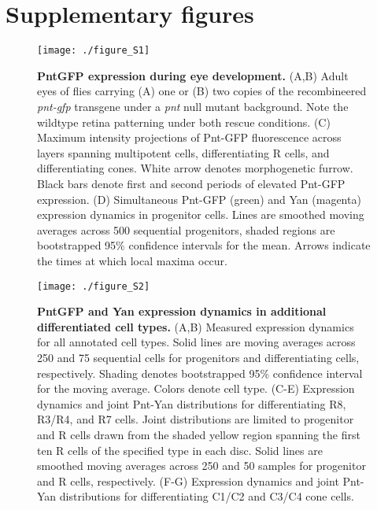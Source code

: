 \graphicspath{ {./figures/ratio/} }


\section{Supplementary figures}

\begin{figure}[h]
\centering
\texttt{[image: ./figure\_S1]}
\caption[PntGFP expression during eye development.]{\textbf{PntGFP expression during eye development.} (A,B) Adult eyes of flies carrying (A) one or (B) two copies of the recombineered \textit{pnt-gfp} transgene under a \textit{pnt} null mutant background. Note the wildtype retina patterning under both rescue conditions. (C) Maximum intensity projections of Pnt-GFP fluorescence across layers spanning multipotent cells, differentiating R cells, and differentiating cones. White arrow denotes morphogenetic furrow. Black bars denote first and second periods of elevated Pnt-GFP expression. (D) Simultaneous Pnt-GFP (green) and Yan (magenta) expression dynamics in progenitor cells. Lines are smoothed moving averages across 500 sequential progenitors, shaded regions are bootstrapped 95\% confidence intervals for the mean. Arrows indicate the times at which local maxima occur.}
\label{fig:ratio:figS1}
\end{figure}

\begin{figure}[h]
\centering
\texttt{[image: ./figure\_S2]}
\caption[PntGFP and Yan expression dynamics in additional cell types.]{\textbf{PntGFP and Yan expression dynamics in additional differentiated cell types.} (A,B) Measured expression dynamics for all annotated cell types. Solid lines are moving averages across 250 and 75 sequential cells for progenitors and differentiating cells, respectively. Shading denotes bootstrapped 95\% confidence interval for the moving average. Colors denote cell type. (C-E) Expression dynamics and joint Pnt-Yan distributions for differentiating R8, R3/R4, and R7 cells. Joint distributions are limited to progenitor and R cells drawn from the shaded yellow region spanning the first ten R cells of the specified type in each disc. Solid lines are smoothed moving averages across 250 and 50 samples for progenitor and R cells, respectively. (F-G) Expression dynamics and joint Pnt-Yan distributions for differentiating C1/C2 and C3/C4 cone cells.}
\label{fig:ratio:figS2}
\end{figure}

